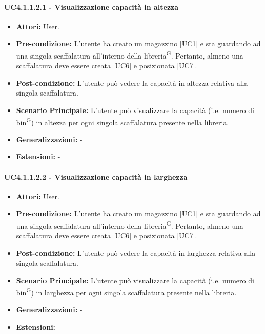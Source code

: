 \paragraph{UC4.1.1.2.1 - Visualizzazione capacità in altezza}
\begin{itemize}
    \item \textbf{Attori:} User.
    \item \textbf{Pre-condizione:} L'utente ha creato un magazzino [UC1] e sta guardando ad una singola scaffalatura all'interno della libreria\textsuperscript{G}. Pertanto, almeno una scaffalatura deve essere creata [UC6] e posizionata [UC7].
    \item \textbf{Post-condizione:} L'utente può vedere la capacità in altezza relativa alla singola scaffalatura.
    \item \textbf{Scenario Principale:} L'utente può visualizzare la capacità (i.e. numero di bin\textsuperscript{G}) in altezza per ogni singola scaffalatura presente nella libreria.
    \item \textbf{Generalizzazioni:} -
    \item \textbf{Estensioni:} -
\end{itemize}


\paragraph{UC4.1.1.2.2 - Visualizzazione capacità in larghezza}
\begin{itemize}
    \item \textbf{Attori:} User.
    \item \textbf{Pre-condizione:} L'utente ha creato un magazzino [UC1] e sta guardando ad una singola scaffalatura all'interno della libreria\textsuperscript{G}. Pertanto, almeno una scaffalatura deve essere creata [UC6] e posizionata [UC7].
    \item \textbf{Post-condizione:} L'utente può vedere la capacità in larghezza relativa alla singola scaffalatura.
    \item \textbf{Scenario Principale:}  L'utente può visualizzare la capacità (i.e. numero di bin\textsuperscript{G}) in larghezza per ogni singola scaffalatura presente nella libreria.
    \item \textbf{Generalizzazioni:} -
    \item \textbf{Estensioni:} -
\end{itemize}


